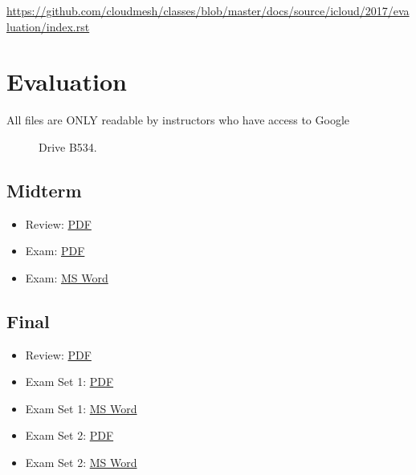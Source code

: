 \begin{fileremark}\url{https://github.com/cloudmesh/classes/blob/master/docs/source/icloud/2017/evaluation/index.rst}\end{fileremark}
\section{Evaluation}\label{evaluation}

\begin{description}
\item[All files are ONLY readable by instructors who have access to
Google]
Drive B534.
\end{description}

\subsection{Midterm}\label{midterm}

\begin{itemize}
\tightlist
\item
  Review:
  \href{https://drive.google.com/open?id=0B88HKpainTSfWGM1T1g1Tk1mYmM}{PDF}
\item
  Exam:
  \href{https://drive.google.com/open?id=0B88HKpainTSfS0syc1NEVDJjZDA}{PDF}
\item
  Exam:
  \href{https://drive.google.com/open?id=0B88HKpainTSfbXhROGptVi1iN1k}{MS
  Word}
\end{itemize}

\subsection{Final}\label{final}

\begin{itemize}
\tightlist
\item
  Review:
  \href{https://drive.google.com/open?id=0B88HKpainTSfRnV2WXZWbTNtLWc}{PDF}
\item
  Exam Set 1:
  \href{https://drive.google.com/open?id=0B88HKpainTSfWnVjVHpJTUFFYlU}{PDF}
\item
  Exam Set 1:
  \href{https://drive.google.com/open?id=0B88HKpainTSfNU1ldmItN3RIcUU}{MS
  Word}
\item
  Exam Set 2:
  \href{https://drive.google.com/open?id=0B88HKpainTSfTVZxMTZ4MC1sNFU}{PDF}
\item
  Exam Set 2:
  \href{https://drive.google.com/open?id=0B88HKpainTSfMGRzWDgtT1VDbEk}{MS
  Word}
\end{itemize}


